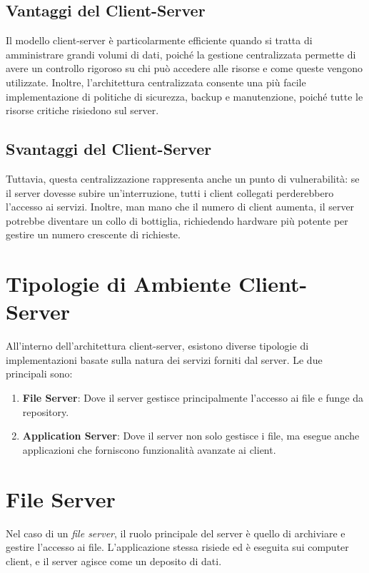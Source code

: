 \documentclass[12pt]{report}
\begin{document}
	\subsection{Vantaggi del Client-Server}
	Il modello client-server è particolarmente efficiente quando si tratta di amministrare grandi volumi di dati, poiché la gestione centralizzata permette di avere un controllo rigoroso su chi può accedere alle risorse e come queste vengono utilizzate. Inoltre, l'architettura centralizzata consente una più facile implementazione di politiche di sicurezza, backup e manutenzione, poiché tutte le risorse critiche risiedono sul server.

	\subsection{Svantaggi del Client-Server}
	Tuttavia, questa centralizzazione rappresenta anche un punto di vulnerabilità: se il server dovesse subire un'interruzione, tutti i client collegati perderebbero l'accesso ai servizi. Inoltre, man mano che il numero di client aumenta, il server potrebbe diventare un collo di bottiglia, richiedendo hardware più potente per gestire un numero crescente di richieste.

	\section{Tipologie di Ambiente Client-Server}
	All'interno dell'architettura client-server, esistono diverse tipologie di implementazioni basate sulla natura dei servizi forniti dal server. Le due principali sono:
	\begin{enumerate}
		\item \textbf{File Server}: Dove il server gestisce principalmente l'accesso ai file e funge da repository.
		\item \textbf{Application Server}: Dove il server non solo gestisce i file, ma esegue anche applicazioni che forniscono funzionalità avanzate ai client.
	\end{enumerate}

	\section{File Server}
	Nel caso di un \textit{file server}, il ruolo principale del server è quello di archiviare e gestire l'accesso ai file. L'applicazione stessa risiede ed è eseguita sui computer client, e il server agisce come un deposito di dati. 
\end{document}
